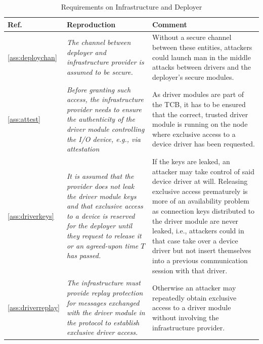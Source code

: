 \clearpage

\begin{longtable}{|p{}|p{}|p{}|}
\caption{Requirements on Infrastructure and Deployer}\\
\hline
Ref. & Reproduction & Comment \\
\hline
\hline

\ref{ass:deploychan} & 
\em The channel between deployer and infrastructure provider is assumed to be secure. &
Without a secure channel between these entities, attackers could launch man in the middle attacks between drivers and the deployer's secure modules. \\
\hline

\ref{ass:attest} & 
\em Before granting such access, the infrastructure provider needs to ensure the authenticity of the driver module controlling the I/O device, e.g., via attestation &
As driver modules are part of the TCB, it has to be ensured that the correct, trusted driver module is running on the node where exclusive access to a device driver has been requested. \\
\hline

\ref{ass:driverkeys} & 
\em It is assumed that the provider does not leak the driver module keys and that exclusive access to a device is reserved for the deployer until they request to release it or an agreed-upon time $T$ has passed. & 
If the keys are leaked, an attacker may take control of said device driver at will. Releasing exclusive access prematurely is more of an availability problem as connection keys distributed to the driver module are never leaked, i.e., attackers could in that case take over a device driver but not insert themselves into a previous communication session with that driver.\\
\hline

\ref{ass:driverreplay} & 
\em The infrastructure must provide replay protection for messages exchanged with the driver module in the protocol to establish exclusive driver access. &
Otherwise an attacker may repeatedly obtain exclusive access to a driver module without involving the infrastructure provider.\\
\hline

\end{longtable}

